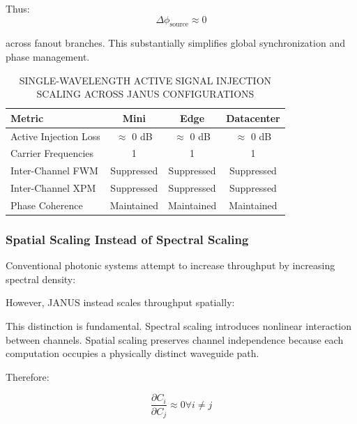 \documentclass[journal]{IEEEtran}
\begin{document}
Thus:
\begin{equation}
\Delta \phi_{\text{source}} \approx 0
\end{equation}

across fanout branches.
This substantially simplifies global synchronization and phase management.

\begin{table}[htbp]
\centering
\small
\setlength{\tabcolsep}{7pt}
\caption{SINGLE-WAVELENGTH ACTIVE SIGNAL INJECTION SCALING ACROSS JANUS CONFIGURATIONS}
\label{tab:table8}
\begin{tabular}{lccc}
\toprule
Metric & Mini & Edge & Datacenter \\
\midrule
Active Injection Loss & $\approx$ 0 dB & $\approx$ 0 dB & $\approx$ 0 dB \\
Carrier Frequencies & 1 & 1 & 1 \\
Inter-Channel FWM & Suppressed & Suppressed & Suppressed \\
Inter-Channel XPM & Suppressed & Suppressed & Suppressed \\
Phase Coherence & Maintained & Maintained & Maintained \\
\bottomrule
\end{tabular}
\end{table}

\subsubsection{\textbf{Spatial Scaling Instead of Spectral Scaling}}

Conventional photonic systems attempt to increase throughput by increasing spectral density:

\begin{center}
\end{center}

However, JANUS instead scales throughput spatially:

\begin{center}
\end{center}

This distinction is fundamental. Spectral scaling introduces nonlinear interaction between channels. Spatial scaling preserves channel independence because each computation occupies a physically distinct waveguide path. 

Therefore:

\begin{equation}
\frac{\partial C_i}{\partial C_j} \approx 0  \forall i \neq  j
\end{equation}
\end{document}
